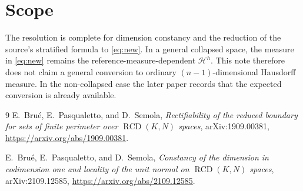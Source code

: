 \documentclass[11pt]{article}
\begin{document}
\section*{Scope}

The resolution is complete for dimension constancy and the reduction of the
source's stratified formula to \eqref{eq:new}.  In a general collapsed space,
the measure in \eqref{eq:new} remains the reference-measure-dependent
$\mathcal H^h$.  This note therefore does not claim a general conversion to
ordinary $(n-1)$-dimensional Hausdorff measure.  In the non-collapsed case the
later paper records that the expected conversion is already available.

\begin{thebibliography}{9}
E.~Bru\'e, E.~Pasqualetto, and D.~Semola,
\emph{Rectifiability of the reduced boundary for sets of finite perimeter
over $\operatorname{RCD}(K,N)$ spaces}, arXiv:1909.00381,
\url{https://arxiv.org/abs/1909.00381}.

E.~Bru\'e, E.~Pasqualetto, and D.~Semola,
\emph{Constancy of the dimension in codimension one and locality of the unit
normal on $\operatorname{RCD}(K,N)$ spaces}, arXiv:2109.12585,
\url{https://arxiv.org/abs/2109.12585}.
\end{thebibliography}
\end{document}
